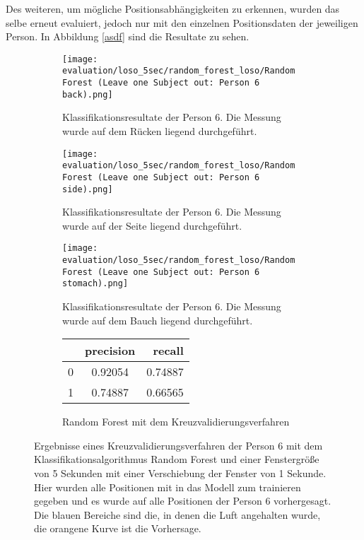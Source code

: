 Des weiteren, um mögliche Positionsabhängigkeiten zu erkennen, wurden das selbe erneut evaluiert, jedoch nur mit den einzelnen Positionsdaten der jeweiligen Person. 
In Abbildung \ref{asdf}  sind die Resultate zu sehen.

\begin{figure}[ht]
    \centering
    \begin{subfigure}{1\textwidth}
        \texttt{[image: evaluation/loso\_5sec/random\_forest\_loso/Random Forest (Leave one Subject out: Person 6 back).png]}
        \caption{Klassifikationsresultate der Person 6. Die Messung wurde auf dem Rücken liegend durchgeführt.}
      \end{subfigure}
      \begin{subfigure}{1\textwidth}
        \texttt{[image: evaluation/loso\_5sec/random\_forest\_loso/Random Forest (Leave one Subject out: Person 6 side).png]}
        \caption{Klassifikationsresultate der Person 6. Die Messung wurde auf der Seite liegend durchgeführt.}
      \end{subfigure}
      \begin{subfigure}{1\textwidth}
        \texttt{[image: evaluation/loso\_5sec/random\_forest\_loso/Random Forest (Leave one Subject out: Person 6 stomach).png]}
        \caption{Klassifikationsresultate der Person 6. Die Messung wurde auf dem Bauch liegend durchgeführt.}
    \end{subfigure}
    \label{evaluation:random_forest_loso_5:person6}

    \begin{subfigure}{1\textwidth}
        \begin{center}
            \begin{tabular}{ | l | c | r | }
              \hline
               & precision & recall \\ \hline
              0 & 0.92054 & 0.74887 \\ \hline
              1 & 0.74887 & 0.66565 \\
              \hline
            \end{tabular}
        \end{center}
        \caption{Random Forest mit dem Kreuzvalidierungsverfahren}
        \label{implementation:app:screenshots:user_studies_information}
    \end{subfigure}
    \caption{Ergebnisse eines Kreuzvalidierungsverfahren der Person 6 mit dem Klassifikationsalgorithmus Random Forest und einer Fenstergröße von 5 Sekunden mit einer Verschiebung der Fenster von 1 Sekunde. Hier wurden alle Positionen mit in das Modell zum trainieren gegeben und es wurde auf alle Positionen der Person 6 vorhergesagt. Die blauen Bereiche sind die, in denen die Luft angehalten wurde, die orangene Kurve ist die Vorhersage.}
\end{figure}

